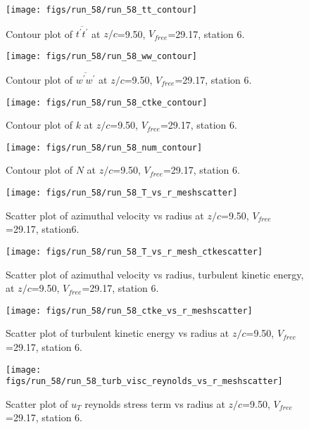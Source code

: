 \begin{figure}[H]
\centering
\texttt{[image: figs/run\_58/run\_58\_tt\_contour]}
\caption{Contour plot of $\overline{t^\prime t^\prime}$ at $z/c$=9.50, $V_{free}$=29.17, station 6.}
\end{figure}


\begin{figure}[H]
\centering
\texttt{[image: figs/run\_58/run\_58\_ww\_contour]}
\caption{Contour plot of $\overline{w^\prime w^\prime}$ at $z/c$=9.50, $V_{free}$=29.17, station 6.}
\end{figure}


\begin{figure}[H]
\centering
\texttt{[image: figs/run\_58/run\_58\_ctke\_contour]}
\caption{Contour plot of $k$ at $z/c$=9.50, $V_{free}$=29.17, station 6.}
\end{figure}


\begin{figure}[H]
\centering
\texttt{[image: figs/run\_58/run\_58\_num\_contour]}
\caption{Contour plot of $N$ at $z/c$=9.50, $V_{free}$=29.17, station 6.}
\end{figure}


\begin{figure}[H]
\centering
\texttt{[image: figs/run\_58/run\_58\_T\_vs\_r\_meshscatter]}
\caption{Scatter plot of azimuthal velocity vs radius at $z/c$=9.50, $V_{free}$=29.17, station6.}
\end{figure}


\begin{figure}[H]
\centering
\texttt{[image: figs/run\_58/run\_58\_T\_vs\_r\_mesh\_ctkescatter]}
\caption{Scatter plot of azimuthal velocity vs radius, turbulent kinetic energy, at $z/c$=9.50, $V_{free}$=29.17, station 6.}
\end{figure}


\begin{figure}[H]
\centering
\texttt{[image: figs/run\_58/run\_58\_ctke\_vs\_r\_meshscatter]}
\caption{Scatter plot of turbulent kinetic energy vs radius at $z/c$=9.50, $V_{free}$=29.17, station 6.}
\end{figure}


\begin{figure}[H]
\centering
\texttt{[image: figs/run\_58/run\_58\_turb\_visc\_reynolds\_vs\_r\_meshscatter]}
\caption{Scatter plot of $
u_T$ reynolds stress term vs radius at $z/c$=9.50, $V_{free}$=29.17, station 6.}
\end{figure}


